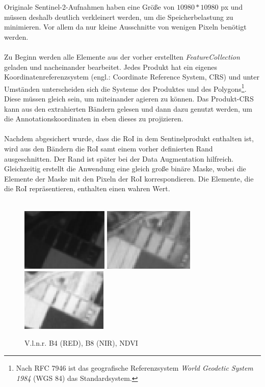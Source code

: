 Originale Sentinel-2-Aufnahmen haben eine Größe von $10980*10980$ px und müssen deshalb deutlich verkleinert werden, um die Speicherbelastung zu minimieren. Vor allem da nur kleine Ausschnitte von wenigen Pixeln benötigt werden. 
\\\\
Zu Beginn werden alle Elemente aus der vorher erstellten \textit{FeatureCollection} geladen und nacheinander bearbeitet. Jedes Produkt hat ein eigenes Koordinatenreferenzsystem (engl.: Coordinate Reference System, CRS) und unter Umständen unterscheiden sich die Systeme des Produktes und des Polygons\footnote{Nach RFC 7946 ist das geografische Referenzsystem \textit{World Geodetic
 System 1984} (WGS 84) das Standardsystem.\cite{ref:rfc7946}}. Diese müssen gleich sein, um miteinander agieren zu können. Das Produkt-CRS kann aus den extrahierten Bändern gelesen und dann dazu genutzt werden, um die Annotationskoordinaten in eben dieses zu projizieren.
 \\\\
 Nachdem abgesichert wurde, dass die RoI in dem Sentinelprodukt enthalten ist, wird aus den Bändern die RoI samt einem vorher definierten Rand ausgeschnitten. Der Rand ist später bei der Data Augmentation hilfreich. Gleichzeitig erstellt die Anwendung eine gleich große binäre Maske, wobei die Elemente der Maske mit den Pixeln der RoI korrespondieren. Die Elemente, die die RoI repräsentieren, enthalten einen wahren Wert.
 \\\\
\begin{figure}[ht]
  \centering
  \includegraphics[height=3cm]{pics/b4.PNG}
  \includegraphics[height=3cm]{pics/b8.PNG}
  \includegraphics[height=3cm]{pics/ndvi.PNG}
  \caption[B4 - B8 - NDVI]{V.l.n.r. B4 (RED), B8 (NIR), NDVI}
  \label{fig:ndvi}
\end{figure}
